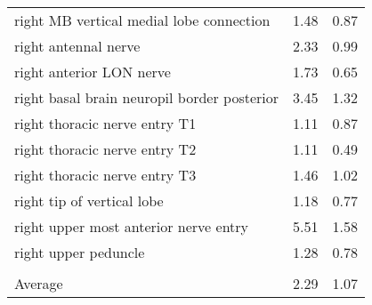 \begin{tabular}{lcc}
 right MB vertical medial lobe connection    & 1.48          & 0.87             \\
 right antennal nerve                        & 2.33          & 0.99             \\
 right anterior LON nerve                    & 1.73          & 0.65             \\
 right basal brain neuropil border posterior & 3.45          & 1.32             \\
 right thoracic nerve entry T1               & 1.11          & 0.87             \\
 right thoracic nerve entry T2               & 1.11          & 0.49             \\
 right thoracic nerve entry T3               & 1.46          & 1.02             \\
 right tip of vertical lobe                  & 1.18          & 0.77             \\
 right upper most anterior nerve entry       & 5.51          & 1.58             \\
 right upper peduncle                        & 1.28          & 0.78             \\
                                             &               &                  \\ \hline \hline
 Average                                     & 2.29          & 1.07             \\
\hline
\end{tabular}
